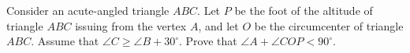 Consider an acute-angled triangle $ABC$. Let $P$ be the foot of the altitude of triangle $ABC$ issuing from the vertex $A$,  and let $O$ be the circumcenter of triangle $ABC$. Assume that $\angle C \geq \angle B+30^{\circ}$. Prove that $\angle A+\angle COP < 90^{\circ}$.
